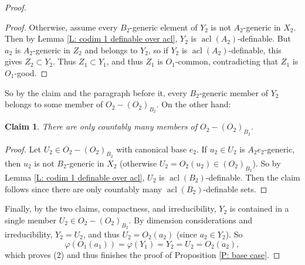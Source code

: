 \documentclass{amsart}
\newtheorem{claim}[theorem]{Claim}
\theoremstyle{definition}
\newcommand{\acl}{\operatorname{acl}}
\begin{document}
\begin{proof}
\begin{proof}
        Otherwise, assume every $B_2$-generic element of $Y_2$ is not $A_2$-generic in $X_2$. Then by Lemma \ref{L: codim 1 definable over acl}, $Y_2$ is $\acl(A_2)$-definable. But $a_2$ is $A_2$-generic in $Z_2$ and belongs to $Y_2$, so if $Y_2$ is $\operatorname{acl}(A_2)$-definable, this gives $Z_2\subset Y_2$. Thus $Z_1\subset Y_1$, and thus $Z_1$ is $O_1$-common, contradicting that $Z_1$ is $O_1$-good.
    \end{proof}

    So by the claim and the paragraph before it, every $B_2$-generic member of $Y_2$ belongs to some member of $O_2-(O_2)_{B_2}$. On the other hand:
    
    \begin{claim}
        There are only countably many members of $O_2-(O_2)_{B_2}$.
    \end{claim}
    \begin{proof} Let $U_2\in O_2-(O_2)_{B_2}$ with canonical base $e_2$. If $u_2\in U_2$ is $A_2e_2$-generic, then $u_2$ is not $B_2$-generic in $X_2$ (otherwise $U_2=O_2(u_2)\in(O_2)_{B_2}$). So by Lemma \ref{L: codim 1 definable over acl}, $U_2$ is $\operatorname{acl}(B_2)$-definable. Then the claim follows since there are only countably many $\acl(B_2)$-definable sets.
    \end{proof}

    Finally, by the two claims, compactness, and irreducibility, $Y_2$ is contained in a single member $U_2\in O_2-(O_2)_{B_2}$. By dimension considerations and irreducibility, $Y_2=U_2$, and thus $U_2=O_2(a_2)$ (since $a_2\in Y_2$). So $$\varphi(O_1(a_1))=\varphi(Y_1)=Y_2=U_2=O_2(a_2),$$ which proves (2) and thus finishes the proof of Proposition \ref{P: base case}.
    \end{proof}

    
    
\end{document}

